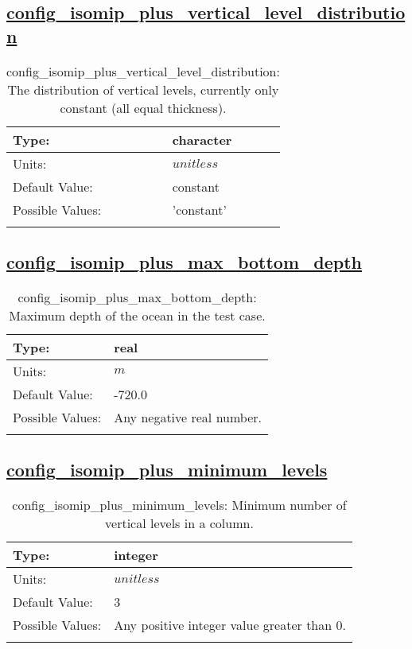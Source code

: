 \subsection[config\_isomip\_plus\_vertical\_level\_distribution]{\hyperref[sec:nm_tab_isomip_plus]{config\_isomip\_plus\_vertical\_level\_distribution}}
\label{subsec:nm_sec_config_isomip_plus_vertical_level_distribution}
\begin{center}
\begin{longtable}{| p{2.0in} || p{4.0in} |}
    \hline
    Type: & character \\
    \hline
    Units: & $unitless$ \\
    \hline
    Default Value: & constant \\
    \hline
    Possible Values: & 'constant' \\
    \hline
    \caption{config\_isomip\_plus\_vertical\_level\_distribution: The distribution of vertical levels, currently only constant (all equal thickness).}
\end{longtable}
\end{center}
\subsection[config\_isomip\_plus\_max\_bottom\_depth]{\hyperref[sec:nm_tab_isomip_plus]{config\_isomip\_plus\_max\_bottom\_depth}}
\label{subsec:nm_sec_config_isomip_plus_max_bottom_depth}
\begin{center}
\begin{longtable}{| p{2.0in} || p{4.0in} |}
    \hline
    Type: & real \\
    \hline
    Units: & $m$ \\
    \hline
    Default Value: & -720.0 \\
    \hline
    Possible Values: & Any negative real number. \\
    \hline
    \caption{config\_isomip\_plus\_max\_bottom\_depth: Maximum depth of the ocean in the test case.}
\end{longtable}
\end{center}
\subsection[config\_isomip\_plus\_minimum\_levels]{\hyperref[sec:nm_tab_isomip_plus]{config\_isomip\_plus\_minimum\_levels}}
\label{subsec:nm_sec_config_isomip_plus_minimum_levels}
\begin{center}
\begin{longtable}{| p{2.0in} || p{4.0in} |}
    \hline
    Type: & integer \\
    \hline
    Units: & $unitless$ \\
    \hline
    Default Value: & 3 \\
    \hline
    Possible Values: & Any positive integer value greater than 0. \\
    \hline
    \caption{config\_isomip\_plus\_minimum\_levels: Minimum number of vertical levels in a column.}
\end{longtable}
\end{center}
